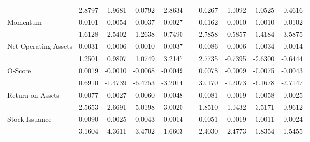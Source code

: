 \begin{table}[htbp]
{\begin{tabular}{lrrrrlrrrr}
& 2.8797 & -1.9681 & 0.0792 & 2.8634 &       & -0.0267 & -1.0092 & 0.0525 & 0.4616 \\
Momentum & 0.0101 & -0.0054 & -0.0037 & -0.0027 &       & 0.0162 & -0.0010 & -0.0010 & -0.0102 \\
& 1.6128 & -2.5402 & -1.2638 & -0.7490 &       & 2.7858 & -0.5857 & -0.4184 & -3.5875 \\
Net Operating Assets & 0.0031 & 0.0006 & 0.0010 & 0.0037 &       & 0.0086 & -0.0006 & -0.0034 & -0.0014 \\
& 1.2501 & 0.9807 & 1.0749 & 3.2147 &       & 2.7735 & -0.7395 & -2.6300 & -0.6444 \\
O-Score & 0.0019 & -0.0010 & -0.0068 & -0.0049 &       & 0.0078 & -0.0009 & -0.0075 & -0.0043 \\
& 0.6910 & -1.4739 & -6.4253 & -3.2014 &       & 3.0170 & -1.2073 & -6.1678 & -2.7147 \\
Return on Assets & 0.0077 & -0.0027 & -0.0060 & -0.0048 &       & 0.0081 & -0.0019 & -0.0058 & 0.0025 \\
& 2.5653 & -2.6691 & -5.0198 & -3.0020 &       & 1.8510 & -1.0432 & -3.5171 & 0.9612 \\
Stock Issuance & 0.0090 & -0.0025 & -0.0043 & -0.0014 &       & 0.0051 & -0.0019 & -0.0011 & 0.0024 \\
& 3.1604 & -4.3611 & -3.4702 & -1.6603 &       & 2.4030 & -2.4773 & -0.8354 & 1.5455 \\
\bottomrule
\end{tabular}%
}
\label{tab:epu-ff3}%
\end{table}%

